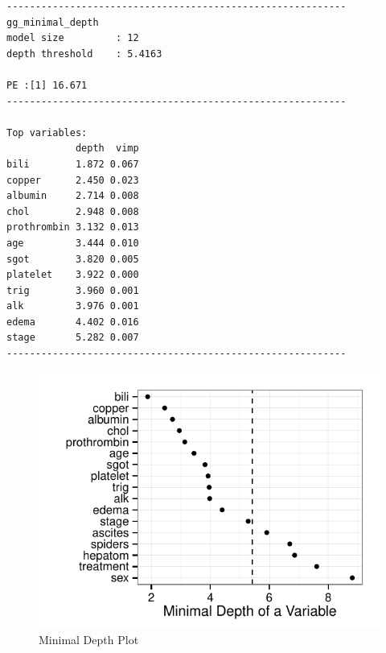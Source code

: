 \documentclass[nojss]{jss}\usepackage[]{graphicx}\usepackage[]{color}
\makeatletter
\def\maxwidth{ %
  \ifdim\Gin@nat@width>\linewidth
    \linewidth
  \else
    \Gin@nat@width
  \fi
}
\newenvironment{kframe}{%
 \def\at@end@of@kframe{}%
 \ifinner\ifhmode%
  \def\at@end@of@kframe{\end{minipage}}%
  \begin{minipage}{\columnwidth}%
 \fi\fi%
 \def\FrameCommand##1{\hskip\@totalleftmargin \hskip-\fboxsep
 \colorbox{shadecolor}{##1}\hskip-\fboxsep
     \hskip-\linewidth \hskip-\@totalleftmargin \hskip\columnwidth}%
 \MakeFramed {\advance\hsize-\width
   \@totalleftmargin\z@ \linewidth\hsize
   \@setminipage}}%
 {\par\unskip\endMakeFramed%
 \at@end@of@kframe}
\newenvironment{knitrout}{}{} %
\makeatother
\begin{document}
\begin{knitrout}\footnotesize
{}\color{fgcolor}\begin{kframe}
\begin{verbatim}
-----------------------------------------------------------
gg_minimal_depth
model size         : 12 
depth threshold    : 5.4163 

PE :[1] 16.671
-----------------------------------------------------------

Top variables:
            depth  vimp
bili        1.872 0.067
copper      2.450 0.023
albumin     2.714 0.008
chol        2.948 0.008
prothrombin 3.132 0.013
age         3.444 0.010
sgot        3.820 0.005
platelet    3.922 0.000
trig        3.960 0.001
alk         3.976 0.001
edema       4.402 0.016
stage       5.282 0.007
-----------------------------------------------------------
\end{verbatim}
\end{kframe}
\end{knitrout}

\begin{knitrout}\footnotesize
{}\color{fgcolor}\begin{figure}[!htpb]

{\centering \includegraphics[width=\maxwidth]{figure/rfs-mindepth-plot-1} 

}

\caption[Minimal Depth Plot]{Minimal Depth Plot\label{fig:mindepth-plot}}
\end{figure}


\end{knitrout}
\end{document}
